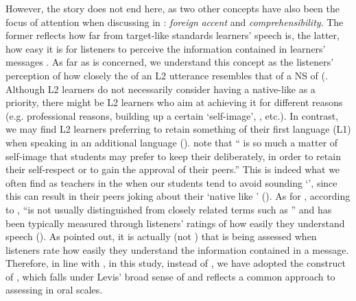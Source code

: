 \documentclass[output=paper]{langsci/langscibook}
\begin{document}
However, the story does not end here, as two other concepts have also been the focus of attention when discussing  in : \textit{foreign} \textit{accent} and \textit{comprehensibility}.  The former reflects how far from target-like standards learners’ speech is, the latter, how easy it is for listeners to perceive the information contained in learners’ messages \citep{Isaacs2010}. As far as  is concerned, we understand this concept as the listeners’ perception of how closely the  of an {L2} utterance resembles that of a NS of  (\citealt{MunroDerwing1995,MunroDerwing1999,DerwingMunro1997,DerwingMunro2009}. Although {L2} learners do not necessarily consider having a native-like  as a priority, there might be {L2} learners who aim at achieving it for different reasons (e.g. professional reasons, building up a certain ‘self-image’, , etc.). In contrast, we may find {L2} learners preferring to retain something of their first language (L1)  when speaking in an additional language (\citealt{PorterGarvin1989}). \citet[7]{DaltonSeidlhofer1994} note that “ is so much a matter of self-image that students may prefer to keep their  deliberately, in order to retain their self-respect or to gain the approval of their peers.” This is indeed what we often find as teachers in the  when our students tend to avoid sounding ‘’, since this can result in their peers joking about their ‘native like ’ (\citealt{FisherEvans2000}). As for , according to \citet[252]{Levis2006},  “is not usually distinguished from closely related terms such as ” and has been typically measured through listeners’ ratings of how easily they understand speech (\citealt{MunroDerwing1999}). As \citet{IsaacsTrofimovich2012} pointed out, it is actually  (not ) that is being assessed when listeners rate how easily they understand the information contained in a message. Therefore, in line with \citet{TrofimovichIsaacs2012}, in this study, instead of , we have adopted the construct of , which falls under Levis’ broad sense of  and reflects a common approach to assessing  in oral  scales.
\end{document}
